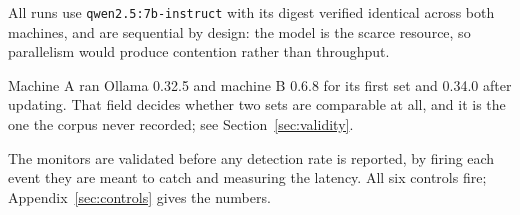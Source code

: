 All runs use \texttt{qwen2.5:7b-instruct} with its digest verified identical
across both machines, and are sequential by design: the model is the scarce
resource, so parallelism would produce contention rather than throughput.

Machine A ran Ollama 0.32.5 and machine B 0.6.8 for its first set and 0.34.0
after updating. That field decides whether two sets are comparable at all, and
it is the one the corpus never recorded; see Section~\ref{sec:validity}.

The monitors are validated before any detection rate is reported, by firing
each event they are meant to catch and measuring the latency. All six controls
fire; Appendix~\ref{sec:controls} gives the numbers.

